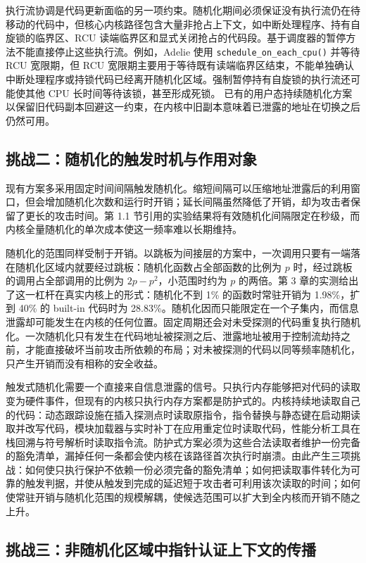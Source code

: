 执行流协调是代码更新面临的另一项约束。随机化期间必须保证没有执行流仍在待移动的代码中，但核心内核路径包含大量非抢占上下文，如中断处理程序、持有自旋锁的临界区、RCU 读端临界区和显式关闭抢占的代码段。基于调度器的暂停方法不能直接停止这些执行流。例如，Adelie 使用 \lstinline[breaklines=false]@schedule_on_each_cpu()@ 并等待 RCU 宽限期，但 RCU 宽限期主要用于等待既有读端临界区结束，不能单独确认中断处理程序或持锁代码已经离开随机化区域。强制暂停持有自旋锁的执行流还可能使其他 CPU 长时间等待该锁，甚至形成死锁。 已有的用户态持续随机化方案以保留旧代码副本回避这一约束，在内核中旧副本意味着已泄露的地址在切换之后仍然可用。

\subsection{挑战二：随机化的触发时机与作用对象}

现有方案多采用固定时间间隔触发随机化。缩短间隔可以压缩地址泄露后的利用窗口，但会增加随机化次数和运行时开销；延长间隔虽然降低了开销，却为攻击者保留了更长的攻击时间。第 1.1 节引用的实验结果将有效随机化间隔限定在秒级，而内核全量随机化的单次成本使这一频率难以长期维持。

随机化的范围同样受制于开销。以跳板为间接层的方案中，一次调用只要有一端落在随机化区域内就要经过跳板：随机化函数占全部函数的比例为 \(p\) 时，经过跳板的调用占全部调用的比例为 \(2p-p^{2}\)，小范围时约为 \(p\) 的两倍。第 3 章的实测给出了这一杠杆在真实内核上的形式：随机化不到 1\% 的函数时常驻开销为 1.98\%，扩到 40\% 的 built-in 代码时为 28.83\%。随机化因而只能限定在一个子集内，而信息泄露却可能发生在内核的任何位置。固定周期还会对未受探测的代码重复执行随机化。一次随机化只有发生在代码地址被探测之后、泄露地址被用于控制流劫持之前，才能直接破坏当前攻击所依赖的布局；对未被探测的代码以同等频率随机化，只产生开销而没有相称的安全收益。

触发式随机化需要一个直接来自信息泄露的信号。只执行内存能够把对代码的读取变为硬件事件，但现有的内核只执行内存方案都是防护式的。内核持续地读取自己的代码：动态跟踪设施在插入探测点时读取原指令，指令替换与静态键在启动期读取并改写代码，模块加载器与实时补丁在应用重定位时读取代码，性能分析工具在栈回溯与符号解析时读取指令流。防护式方案必须为这些合法读取者维护一份完备的豁免清单，漏掉任何一条都会使内核在该路径首次执行时崩溃。由此产生三项挑战：如何使只执行保护不依赖一份必须完备的豁免清单；如何把读取事件转化为可靠的触发判据，并使从触发到完成的延迟短于攻击者可利用该次读取的时间；如何使常驻开销与随机化范围的规模解耦，使候选范围可以扩大到全内核而开销不随之上升。

\subsection{挑战三：非随机化区域中指针认证上下文的传播}

